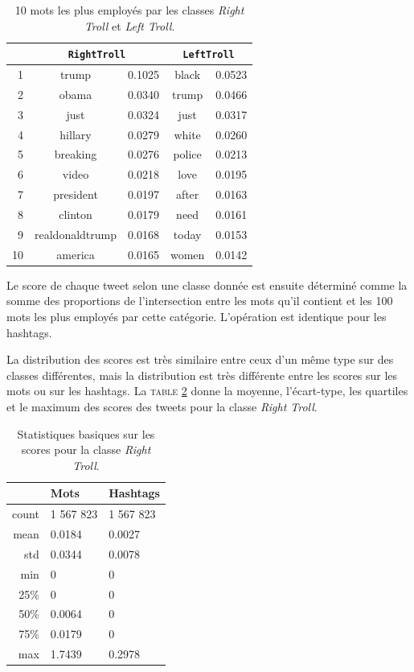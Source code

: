 \documentclass[twocolumn,10pt]{article}
\begin{document}
\begin{table}[htbp]
\begin{center}
\noindent\begin{tabular}{r|cl|cl}
& \multicolumn{2}{c|}{\verb!RightTroll!} & \multicolumn{2}{|c}{\verb!LeftTroll!} \\ 
\hline 
1 & trump & 0.1025 & black & 0.0523\\
2 & obama & 0.0340 & trump & 0.0466\\
3 & just & 0.0324 & just & 0.0317\\
4 & hillary & 0.0279 & white & 0.0260\\
5 & breaking & 0.0276 & police & 0.0213 \\
6 & video & 0.0218 & love & 0.0195\\
7 & president & 0.0197 & after & 0.0163\\
8 & clinton & 0.0179 & need & 0.0161\\
9 & realdonaldtrump & 0.0168 & today & 0.0153\\
10 & america & 0.0165 & women & 0.0142\\
\end{tabular}
\caption{\label{tab:RTLTw} 10 mots les plus employés par les classes \textit{Right Troll} et \textit{Left Troll}.}
\end{center} 
\end{table}

Le score de chaque tweet selon une classe donnée est ensuite déterminé comme la somme des proportions de l'intersection entre les mots qu'il contient et les 100 mots les plus employés par cette catégorie. L'opération est identique pour les hashtags.

La distribution des scores est très similaire entre ceux d'un même type sur des classes différentes, mais la distribution est très différente entre les scores sur les mots ou sur les hashtags. La \textsc{table} \ref{tab:SBRT} donne la moyenne, l'écart-type, les quartiles et le maximum des scores des tweets pour la classe \textit{Right Troll}.

\begin{table}[htbp]
\begin{center}
\noindent\begin{tabular}{r|ll}
 & Mots & Hashtags \\ 
\hline 
count & 1 567 823 & 1 567 823\\
\vspace{1mm}
mean & 0.0184 & 0.0027 \\
std & 0.0344 & 0.0078 \\
min & 0 & 0 \\
25\% & 0 & 0 \\
50\% & 0.0064 & 0 \\
75\% & 0.0179 & 0 \\
max & 1.7439 & 0.2978 \\
\end{tabular}
\caption{\label{tab:SBRT} Statistiques basiques sur les scores pour la classe \textit{Right Troll}.}
\end{center} 
\end{table}
\end{document}
